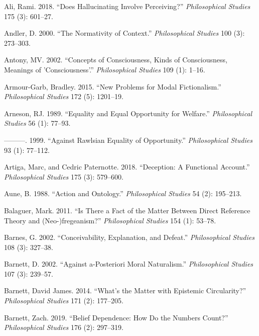 \documentclass[
  10pt,
  letterpaper,
  DIV=11,
  numbers=noendperiod,
  twoside]{scrartcl}
\newlength{\cslhangindent}
\newenvironment{CSLReferences}[2] %
 {\begin{list}{}{%
  \setlength{\itemindent}{0pt}
  \setlength{\leftmargin}{0pt}
  \setlength{\parsep}{0pt}
  \ifodd #1
   \setlength{\leftmargin}{\cslhangindent}
   \setlength{\itemindent}{-1\cslhangindent}
  \fi
  \setlength{\itemsep}{#2\baselineskip}}}
 {\end{list}}
\begin{document}
\label{refs}
\begin{CSLReferences}{1}{0}
Ali, Rami. 2018. {``Does Hallucinating Involve Perceiving?''}
\emph{Philosophical Studies} 175 (3): 601--27.

Andler, D. 2000. {``The Normativity of Context.''} \emph{Philosophical
Studies} 100 (3): 273--303.

Antony, MV. 2002. {``Concepts of Consciousness, Kinds of Consciousness,
Meanings of 'Consciousness'.''} \emph{Philosophical Studies} 109 (1):
1--16.

Armour-Garb, Bradley. 2015. {``New Problems for Modal Fictionalism.''}
\emph{Philosophical Studies} 172 (5): 1201--19.

Arneson, RJ. 1989. {``Equality and Equal Opportunity for Welfare.''}
\emph{Philosophical Studies} 56 (1): 77--93.

---------. 1999. {``Against Rawlsian Equality of Opportunity.''}
\emph{Philosophical Studies} 93 (1): 77--112.

Artiga, Marc, and Cedric Paternotte. 2018. {``Deception: A Functional
Account.''} \emph{Philosophical Studies} 175 (3): 579--600.

Aune, B. 1988. {``Action and Ontology.''} \emph{Philosophical Studies}
54 (2): 195--213.

Balaguer, Mark. 2011. {``Is There a Fact of the Matter Between Direct
Reference Theory and (Neo-)fregeanism?''} \emph{Philosophical Studies}
154 (1): 53--78.

Barnes, G. 2002. {``Conceivability, Explanation, and Defeat.''}
\emph{Philosophical Studies} 108 (3): 327--38.

Barnett, D. 2002. {``Against a-Posteriori Moral Naturalism.''}
\emph{Philosophical Studies} 107 (3): 239--57.

Barnett, David James. 2014. {``What's the Matter with Epistemic
Circularity?''} \emph{Philosophical Studies} 171 (2): 177--205.

Barnett, Zach. 2019. {``Belief Dependence: How Do the Numbers Count?''}
\emph{Philosophical Studies} 176 (2): 297--319.


\end{CSLReferences}
\end{document}
